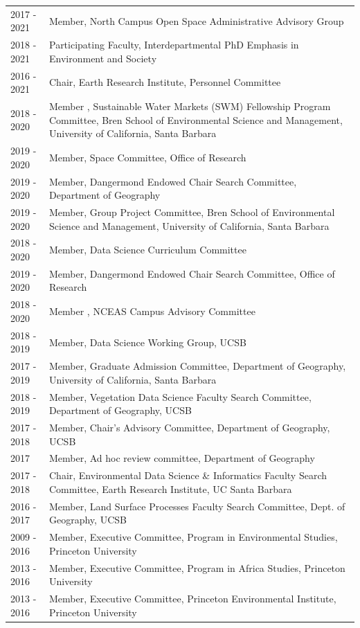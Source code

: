 \begin{longtable}{l p{5.5in}}
2017 - 2021 & Member, North Campus Open Space Administrative Advisory Group \\
2018 - 2021 & Participating Faculty, Interdepartmental PhD Emphasis in Environment and Society \\
2016 - 2021 & Chair, Earth Research Institute, Personnel Committee \\
2018 - 2020 & Member , Sustainable Water Markets (SWM) Fellowship Program Committee, Bren School of Environmental Science and Management, University of California, Santa Barbara \\
2019 - 2020 & Member, Space Committee, Office of Research \\
2019 - 2020 & Member, Dangermond Endowed Chair Search Committee, Department of Geography \\
2019 - 2020 & Member, Group Project Committee, Bren School of Environmental Science and Management, University of California, Santa Barbara \\
2018 - 2020 & Member, Data Science Curriculum Committee \\
2019 - 2020 & Member, Dangermond Endowed Chair Search Committee, Office of Research \\
2018 - 2020 & Member , NCEAS Campus Advisory Committee  \\
2018 - 2019 & Member, Data Science Working Group, UCSB \\
2017 - 2019 & Member, Graduate Admission Committee, Department of Geography, University of California, Santa Barbara \\
2018 - 2019 & Member, Vegetation Data Science Faculty Search Committee, Department of Geography, UCSB \\
2017 - 2018 & Member, Chair's Advisory Committee, Department of Geography, UCSB \\
2017 & Member, Ad hoc review committee, Department of Geography \\
2017 - 2018 & Chair, Environmental Data Science \& Informatics Faculty Search Committee, Earth Research Institute, UC Santa Barbara \\
2016 - 2017 & Member, Land Surface Processes Faculty Search Committee, Dept. of Geography, UCSB \\
2009 - 2016 & Member, Executive Committee, Program in Environmental Studies, Princeton University \\
2013 - 2016 & Member, Executive Committee, Program in Africa Studies, Princeton University \\
2013 - 2016 & Member, Executive Committee, Princeton Environmental Institute, Princeton University \\

\end{longtable}
